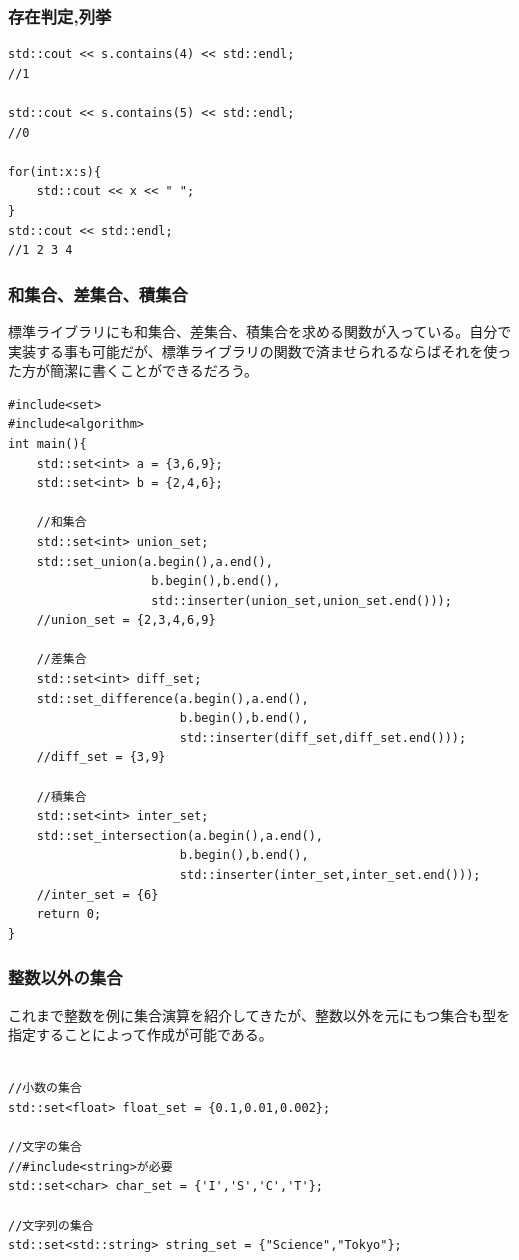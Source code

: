 \documentclass[a4paper,11pt]{ltjsarticle}
\begin{document}
\subsubsection{存在判定,列挙}
\begin{lstlisting}
std::cout << s.contains(4) << std::endl;
//1

std::cout << s.contains(5) << std::endl;
//0

for(int:x:s){
    std::cout << x << " ";
}
std::cout << std::endl;
//1 2 3 4
\end{lstlisting}

\subsubsection{和集合、差集合、積集合}
標準ライブラリにも和集合、差集合、積集合を求める関数が入っている。自分で実装する事も可能だが、標準ライブラリの関数で済ませられるならばそれを使った方が簡潔に書くことができるだろう。
\begin{lstlisting}
#include<set>
#include<algorithm>
int main(){
    std::set<int> a = {3,6,9};
    std::set<int> b = {2,4,6};

    //和集合
    std::set<int> union_set;
    std::set_union(a.begin(),a.end(),
                    b.begin(),b.end(),
                    std::inserter(union_set,union_set.end()));    
    //union_set = {2,3,4,6,9}

    //差集合
    std::set<int> diff_set;
    std::set_difference(a.begin(),a.end(),
                        b.begin(),b.end(),
                        std::inserter(diff_set,diff_set.end()));
    //diff_set = {3,9}

    //積集合
    std::set<int> inter_set;
    std::set_intersection(a.begin(),a.end(),
                        b.begin(),b.end(),
                        std::inserter(inter_set,inter_set.end()));
    //inter_set = {6}
    return 0;
}
\end{lstlisting}
\subsubsection{整数以外の集合}
これまで整数を例に集合演算を紹介してきたが、整数以外を元にもつ集合も型を指定することによって作成が可能である。
\begin{lstlisting}

//小数の集合
std::set<float> float_set = {0.1,0.01,0.002};

//文字の集合
//#include<string>が必要
std::set<char> char_set = {'I','S','C','T'};

//文字列の集合
std::set<std::string> string_set = {"Science","Tokyo"};
\end{lstlisting}
\end{document}
